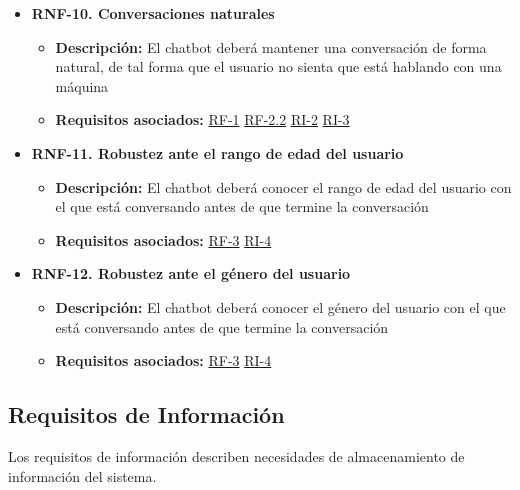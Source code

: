 \begin{itemize}
    \item \textbf{RNF-10. Conversaciones naturales} \label{RNF-10}
    \begin{itemize}
        \item \textbf{Descripción:} El chatbot deberá mantener una conversación de forma natural, de tal forma que el usuario no sienta que está hablando con una máquina
        \item \textbf{Requisitos asociados:} \hyperref[RF-1]{RF-1} \hyperref[RF-2.2]{RF-2.2} \hyperref[RI-2]{RI-2} \hyperref[RI-3]{RI-3}
    \end{itemize}
    
    \item \textbf{RNF-11. Robustez ante el rango de edad del usuario} \label{RNF-11}
    \begin{itemize}
        \item \textbf{Descripción:} El chatbot deberá conocer el rango de edad del usuario con el que está conversando antes de que termine la conversación
        \item \textbf{Requisitos asociados:} \hyperref[RF-3]{RF-3} \hyperref[RI-4]{RI-4}
    \end{itemize}
    
    \item \textbf{RNF-12. Robustez ante el género del usuario} \label{RNF-12}
    \begin{itemize}
        \item \textbf{Descripción:} El chatbot deberá conocer el género del usuario con el que está conversando antes de que termine la conversación
        \item \textbf{Requisitos asociados:} \hyperref[RF-3]{RF-3} \hyperref[RI-4]{RI-4}
    \end{itemize}
\end{itemize}

\subsection{Requisitos de Información}

Los requisitos de información describen necesidades de almacenamiento de información del sistema.

